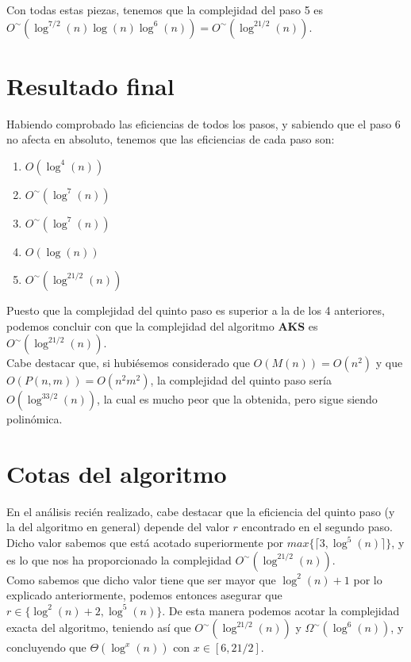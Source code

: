 Con todas estas piezas, tenemos que la complejidad del paso 5 es $O^\sim(\log^{7/2}(n)\log(n)\log^6(n)) = O^\sim(\log^{21/2}(n))$.

\section{Resultado final}

Habiendo comprobado las eficiencias de todos los pasos, y sabiendo que el paso 6 no afecta en absoluto, tenemos que las eficiencias de cada paso son:

\begin{enumerate}
	\item $O(\log^4(n))$
	\item $O^\sim(\log^7(n))$
	\item $O^\sim(\log^7(n))$
	\item $O(\log(n))$
	\item $O^\sim(\log^{21/2}(n))$
\end{enumerate}

Puesto que la complejidad del quinto paso es superior a la de los 4 anteriores, podemos concluir con que la complejidad del algoritmo \textbf{AKS} es $O^\sim(\log^{21/2}(n))$.\\

Cabe destacar que, si hubiésemos considerado que $O(M(n)) = O(n^2)$ y que $O(P(n, m)) = O(n^2m^2)$, la complejidad del quinto paso sería $O(\log^{33/2}(n))$, la cual es mucho peor que la obtenida, pero sigue siendo polinómica.

\section{Cotas del algoritmo}

En el análisis recién realizado, cabe destacar que la eficiencia del quinto paso (y la del algoritmo en general) depende del valor $r$ encontrado en el segundo paso. Dicho valor sabemos que está acotado superiormente por $max\{\lceil 3, \log^5(n) \rceil\}$, y es lo que nos ha proporcionado la complejidad $O^\sim(\log^{21/2}(n))$.\\

Como sabemos que dicho valor tiene que ser mayor que $\log^2(n) + 1$ por lo explicado anteriormente, podemos entonces asegurar que $r \in \{\log^2(n) + 2, \log^5(n)\}$. De esta manera podemos acotar la complejidad exacta del algoritmo, teniendo así que $O^\sim(\log^{21/2}(n))$ y $\Omega^\sim(\log^6(n))$, y concluyendo que $\Theta(\log^x(n))$ con $x \in [6, 21/2]$.

\endinput
